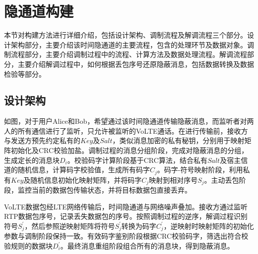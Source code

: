 \section{隐通道构建}
\label{chap:zigzag:model}

本节对构建方法进行详细介绍，包括设计架构、调制流程及解调流程三个部分。设计架构部分，主要介绍该时间隐通道的主要流程，包含的处理环节及数据对象。调制流程部分，主要介绍调制过程中的流程、计算方法及数据处理流程。解调流程部分，主要介绍解调过程中，如何根据丢包序号还原隐蔽消息，包括数据转换及数据检验等部分。

\subsection{设计架构}
\label{chap:zigzag:model:system}


如图，对于用户Alice和Bob，希望通过该时间隐通道传输隐蔽消息，而监听者对两人的所有通信进行了监听，只允许被监听的VoLTE通话。在进行传输前，接收方与发送方预先约定私有的$Key$及$Salt$，类似消息加密的私有秘钥，分别用于映射矩阵初始化及CRC校验加盐。调制过程的消息分组阶段，完成对隐蔽消息的分组，生成定长的消息块$D_{i}$。校验码字计算阶段基于CRC算法，结合私有$Salt$及宿主信道的随机信息，计算码字校验值，生成所有码字$C_{j}$。码字-符号映射阶段，利用私有$Key$及随机信息初始化映射矩阵，并将码字$C_{j}$映射到相对序号$S_{j}$。主动丢包阶段，监控当前的数据包传输状态，并将目标数据包直接丢弃。

VoLTE数据包经LTE网络传输后，时间隐通道与网络噪声叠加。接收方通过监听RTP数据包序号，记录丢失数据包的序号。按照调制过程的逆序，解调过程识别符号$S_{j}^{'}$，然后参照逆映射矩阵将符号$S_{j}^{'}$转换为码字$C_{j}^{'}$，逆映射时映射矩阵的初始化参数与调制阶段保持一致。有效码字鉴别阶段根据CRC校验码字，筛选出符合校验规则的数据块$D_{i}^{'}$。最终消息重组阶段组合所有的消息块，得到隐蔽消息。

